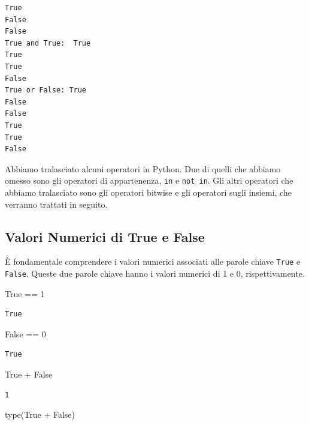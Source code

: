 \documentclass[
  letterpaper,
  krantz2]{{[}./krantz{]}}
\newenvironment{Shaded}{\begin{snugshade}}{\end{snugshade}}
\newcommand{\BuiltInTok}[1]{\textcolor[rgb]{0.00,0.23,0.31}{#1}}
\newcommand{\DecValTok}[1]{\textcolor[rgb]{0.68,0.00,0.00}{#1}}
\newcommand{\NormalTok}[1]{\textcolor[rgb]{0.00,0.23,0.31}{#1}}
\newcommand{\OperatorTok}[1]{\textcolor[rgb]{0.37,0.37,0.37}{#1}}
\newcommand{\VariableTok}[1]{\textcolor[rgb]{0.07,0.07,0.07}{#1}}
\begin{document}
\begin{verbatim}
True
False
False
True and True:  True
True
True
False
True or False: True
False
False
True
True
False
\end{verbatim}

Abbiamo tralasciato alcuni operatori in Python. Due di quelli che
abbiamo omesso sono gli operatori di appartenenza, \texttt{in} e
\texttt{not\ in}. Gli altri operatori che abbiamo tralasciato sono gli
operatori bitwise e gli operatori sugli insiemi, che verranno trattati
in seguito.

\subsection{Valori Numerici di True e
False}\label{valori-numerici-di-true-e-false}

È fondamentale comprendere i valori numerici associati alle parole
chiave \texttt{True} e \texttt{False}. Queste due parole chiave hanno i
valori numerici di 1 e 0, rispettivamente.

\begin{Shaded}
\begin{Highlighting}[]
\VariableTok{True} \OperatorTok{==} \DecValTok{1}
\end{Highlighting}
\end{Shaded}

\begin{verbatim}
True
\end{verbatim}

\begin{Shaded}
\begin{Highlighting}[]
\VariableTok{False} \OperatorTok{==} \DecValTok{0}
\end{Highlighting}
\end{Shaded}

\begin{verbatim}
True
\end{verbatim}

\begin{Shaded}
\begin{Highlighting}[]
\VariableTok{True} \OperatorTok{+} \VariableTok{False}
\end{Highlighting}
\end{Shaded}

\begin{verbatim}
1
\end{verbatim}

\begin{Shaded}
\begin{Highlighting}[]
\BuiltInTok{type}\NormalTok{(}\VariableTok{True} \OperatorTok{+} \VariableTok{False}\NormalTok{)}
\end{Highlighting}
\end{Shaded}
\end{document}
